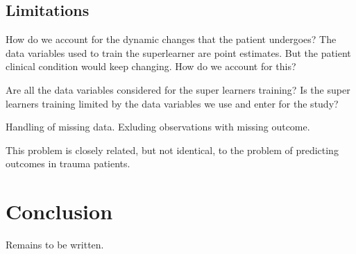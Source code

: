 \documentclass[10pt,letterpaper]{article}\usepackage[]{graphicx}\usepackage[]{color}
\begin{document}

\subsection*{Limitations}
How do we account for the dynamic changes that the patient undergoes? The data
variables used to train the superlearner are point estimates. But the patient
clinical condition would keep changing. How do we account for this?

Are all the data variables considered for the super learners training? Is the
super learners training limited by the data variables we use and enter for the
study?

Handling of missing data. Exluding observations with missing outcome.

This problem is closely related, but not identical, to the problem of predicting
outcomes in trauma patients.

\section*{Conclusion}
Remains to be written.
\end{document}
